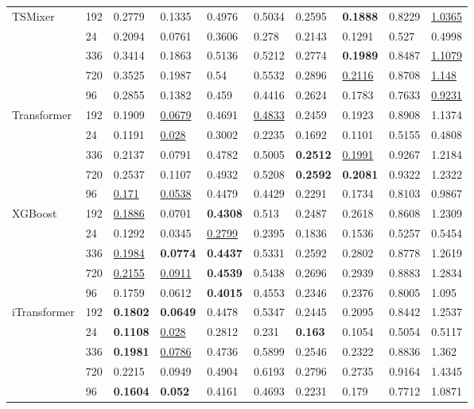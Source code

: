\begin{tabular}{llllllllll}
\cline{1-10}
\multirow[t]{5}{*}{TSMixer} & 192 & 0.2779 & 0.1335 & 0.4976 & 0.5034 & 0.2595 & \textbf{0.1888} & 0.8229 & \underline{1.0365} \\
 & 24 & 0.2094 & 0.0761 & 0.3606 & 0.278 & 0.2143 & 0.1291 & 0.527 & 0.4998 \\
 & 336 & 0.3414 & 0.1863 & 0.5136 & 0.5212 & 0.2774 & \textbf{0.1989} & 0.8487 & \underline{1.1079} \\
 & 720 & 0.3525 & 0.1987 & 0.54 & 0.5532 & 0.2896 & \underline{0.2116} & 0.8708 & \underline{1.148} \\
 & 96 & 0.2855 & 0.1382 & 0.459 & 0.4416 & 0.2624 & 0.1783 & 0.7633 & \underline{0.9231} \\
\cline{1-10}
\multirow[t]{5}{*}{Transformer} & 192 & 0.1909 & \underline{0.0679} & 0.4691 & \underline{0.4833} & 0.2459 & 0.1923 & 0.8908 & 1.1374 \\
 & 24 & 0.1191 & \underline{0.028} & 0.3002 & 0.2235 & 0.1692 & 0.1101 & 0.5155 & 0.4808 \\
 & 336 & 0.2137 & 0.0791 & 0.4782 & 0.5005 & \textbf{0.2512} & \underline{0.1991} & 0.9267 & 1.2184 \\
 & 720 & 0.2537 & 0.1107 & 0.4932 & 0.5208 & \textbf{0.2592} & \textbf{0.2081} & 0.9322 & 1.2322 \\
 & 96 & \underline{0.171} & \underline{0.0538} & 0.4479 & 0.4429 & 0.2291 & 0.1734 & 0.8103 & 0.9867 \\
\cline{1-10}
\multirow[t]{5}{*}{XGBoost} & 192 & \underline{0.1886} & 0.0701 & \textbf{0.4308} & 0.513 & 0.2487 & 0.2618 & 0.8608 & 1.2309 \\
 & 24 & 0.1292 & 0.0345 & \underline{0.2799} & 0.2395 & 0.1836 & 0.1536 & 0.5257 & 0.5454 \\
 & 336 & \underline{0.1984} & \textbf{0.0774} & \textbf{0.4437} & 0.5331 & 0.2592 & 0.2802 & 0.8778 & 1.2619 \\
 & 720 & \underline{0.2155} & \underline{0.0911} & \textbf{0.4539} & 0.5438 & 0.2696 & 0.2939 & 0.8883 & 1.2834 \\
 & 96 & 0.1759 & 0.0612 & \textbf{0.4015} & 0.4553 & 0.2346 & 0.2376 & 0.8005 & 1.095 \\
\cline{1-10}
\multirow[t]{5}{*}{iTransformer} & 192 & \textbf{0.1802} & \textbf{0.0649} & 0.4478 & 0.5347 & 0.2445 & 0.2095 & 0.8442 & 1.2537 \\
 & 24 & \textbf{0.1108} & \underline{0.028} & 0.2812 & 0.231 & \textbf{0.163} & 0.1054 & 0.5054 & 0.5117 \\
 & 336 & \textbf{0.1981} & \underline{0.0786} & 0.4736 & 0.5899 & 0.2546 & 0.2322 & 0.8836 & 1.362 \\
 & 720 & 0.2215 & 0.0949 & 0.4904 & 0.6193 & 0.2796 & 0.2735 & 0.9164 & 1.4345 \\
 & 96 & \textbf{0.1604} & \textbf{0.052} & 0.4161 & 0.4693 & 0.2231 & 0.179 & 0.7712 & 1.0871 \\
\cline{1-10}
\bottomrule
\end{tabular}
